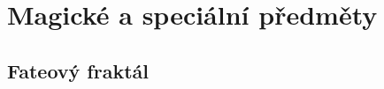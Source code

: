 \chapter{Magické a speciální předměty}
\label{chap:magicke-spec-predmety}

\section{Fateový fraktál}
\label{sec:fraktal}



